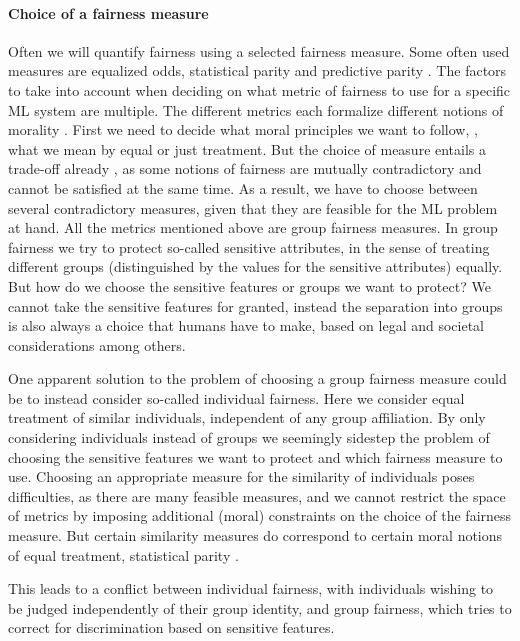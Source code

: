 	\paragraph{Choice of a fairness measure}
	Often we will quantify fairness using a selected fairness measure.
	Some often used measures are equalized odds, statistical parity and predictive parity \cite{garg2020fairness}.
    The factors to take into account when deciding on what metric of fairness to use for a specific ML system are multiple.
	The different metrics each formalize different notions of morality \cite{binns2020apparent}.
    First we need to decide what moral principles we want to follow, \ie, what we mean by equal or just treatment.
	But the choice of measure entails a trade-off already \cite{chouldechova2017fair,kleinberg2016inherent,berk2021fairness}, as some notions of fairness are mutually contradictory and cannot be satisfied at the same time.
	As a result, we have to choose between several contradictory measures, given that they are feasible for the ML problem at hand.
	All the metrics mentioned above are group fairness measures.
	In group fairness we try to protect so-called sensitive attributes, in the sense of treating different groups (distinguished by the values for the sensitive attributes) equally.
	But how do we choose the sensitive features or groups we want to protect?
	We cannot take the sensitive features for granted, instead the separation into groups is also always a choice that humans have to make, based on legal and societal considerations among others.

	One apparent solution to the problem of choosing a group fairness measure could be to instead consider so-called individual fairness.
	Here we consider equal treatment of similar individuals, independent of any group affiliation.
	By only considering individuals instead of groups we seemingly sidestep the problem of choosing the sensitive features we want to protect and which fairness measure to use.
	Choosing an appropriate measure for the similarity of individuals poses difficulties, as there are many feasible measures, and we cannot restrict the space of metrics by imposing additional (moral) constraints on the choice of the fairness measure.
	But certain similarity measures do correspond to certain moral notions of equal treatment, \eg statistical parity \cite{dwork2012fairness}.

    This leads to a conflict between individual fairness, with individuals wishing to be judged independently of their group identity, and group fairness, which tries to correct for discrimination based on sensitive features.

